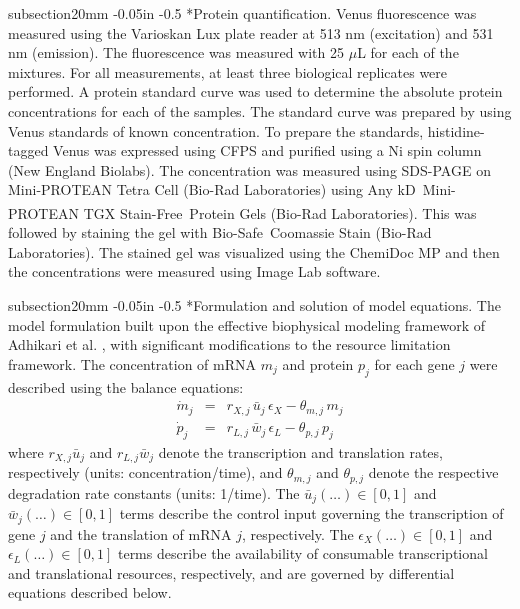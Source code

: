 \documentclass[12pt]{article}
\makeatletter
\renewcommand\subsection{\@startsection
	{subsection}{2}{0mm}
	{-0.05in}
	{-0.5\baselineskip}
	{\normalfont\normalsize\bfseries}}
\makeatother
\begin{document}
\subsection*{Protein quantification.}
Venus fluorescence was measured using the Varioskan Lux plate reader at 513 nm (excitation) and 531 nm (emission). The fluorescence was measured with 25 $\mu$L for each of the mixtures. For all measurements, at least three biological replicates were performed. A protein standard curve was used to determine the absolute protein concentrations for each of the samples. The standard curve was prepared by using Venus standards of known concentration. To prepare the standards, histidine-tagged Venus was expressed using CFPS and purified using a Ni spin column (New England Biolabs). The concentration was measured using SDS-PAGE on Mini-PROTEAN Tetra Cell (Bio-Rad Laboratories) using Any kD\texttrademark~Mini-PROTEAN\textsuperscript{\textregistered} TGX Stain-Free\texttrademark~Protein Gels (Bio-Rad Laboratories). This was followed by staining the gel with Bio-Safe\texttrademark~Coomassie Stain (Bio-Rad Laboratories). The stained gel was visualized using the ChemiDoc MP and then the concentrations were measured using Image Lab software.

\subsection*{Formulation and solution of model equations.}
The model formulation built upon the effective biophysical modeling framework of Adhikari et al. \cite{adhikari2020effective}, with significant modifications to the resource limitation framework. The concentration of mRNA $m_j$ and protein $p_j$ for each gene $j$ were described using the balance equations:
\begin{eqnarray}
\label{eq:mrna_balance}
\dot{m}_j &=& r_{X,j}\,\bar{u}_j\,\epsilon_X - \theta_{m,j}\,m_j \\
\label{eq:prot_balance}
\dot{p}_j &=& r_{L,j}\,\bar{w}_j\,\epsilon_L - \theta_{p,j}\,p_j
\end{eqnarray}
where $r_{X,j}\bar{u}_j$ and $r_{L,j}\bar{w}_j$ denote the transcription and translation rates, respectively (units: concentration/time), and $\theta_{m,j}$ and $\theta_{p,j}$ denote the respective degradation rate constants (units: 1/time). The $\bar{u}_j(\dots) \in [0,1]$ and $\bar{w}_j(\dots) \in [0,1]$ terms describe the control input governing the transcription of gene $j$ and the translation of mRNA $j$, respectively. The $\epsilon_X(\dots) \in [0,1]$ and $\epsilon_L(\dots) \in [0,1]$ terms describe the availability of consumable transcriptional and translational resources, respectively, and are governed by differential equations described below.
\end{document}
